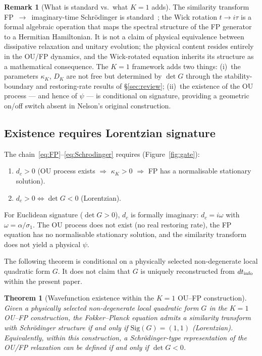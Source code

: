 \documentclass[11pt,a4paper]{article}
\newtheorem{theorem}{Theorem}
\theoremstyle{definition}
\newtheorem{remark}{Remark}
\begin{document}
\begin{remark}[What is standard vs.\ what $K{=}1$ adds]
The similarity transform FP~$\to$~imaginary-time Schr\"odinger is standard~\cite{Nelson,Risken}; the Wick rotation $t \to i\tau$ is a formal algebraic operation that maps the spectral structure of the FP generator to a Hermitian Hamiltonian. It is not a claim of physical equivalence between dissipative relaxation and unitary evolution; the physical content resides entirely in the OU/FP dynamics, and the Wick-rotated equation inherits its structure as a mathematical consequence. The $K{=}1$ framework adds two things: (i)~the parameters $\kappa_K$, $D_K$ are not free but determined by $\det G$ through the stability-boundary and restoring-rate results of \S\ref{sec:review}; (ii)~the existence of the OU process --- and hence of $\psi$ --- is conditional on signature, providing a geometric on/off switch absent in Nelson's original construction.
\end{remark}

\subsection{Existence requires Lorentzian signature}

The chain~\eqref{eq:FP}--\eqref{eq:Schrodinger} requires (Figure~\ref{fig:gate}):
\begin{enumerate}
\item $d_c > 0$ (OU process exists $\Rightarrow$ $\kappa_K > 0$ $\Rightarrow$ FP has a normalisable stationary solution).
\item $d_c > 0 \Leftrightarrow \det G < 0$ (Lorentzian).
\end{enumerate}

For Euclidean signature ($\det G > 0$), $d_c$ is formally imaginary: $d_c = i\omega$ with $\omega = \alpha/\sigma_1$. The OU process does not exist (no real restoring rate), the FP equation has no normalisable stationary solution, and the similarity transform does not yield a physical $\psi$.

The following theorem is conditional on a physically selected
non-degenerate local quadratic form $G$. It does not claim that $G$ is
uniquely reconstructed from $dt_{\rm info}$ within the present paper.

\begin{theorem}[Wavefunction existence within the $K{=}1$ OU--FP construction]\label{thm:main}
Given a physically selected non-degenerate local quadratic form $G$ in
the $K{=}1$ OU--FP construction, the Fokker--Planck equation admits a
similarity transform with Schr\"odinger structure if and only if
$\mathrm{Sig}(G) = (1,1)$ (Lorentzian). Equivalently, within this construction, a Schr\"odinger-type representation of the OU/FP relaxation can be defined if and only if $\det G<0$.
\end{theorem}
\end{document}
